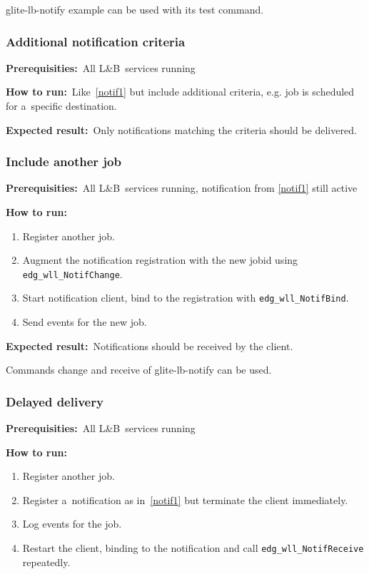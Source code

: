 \documentclass{egee}
\def\LB{L\&B}
\def\req{\noindent\textbf{Prerequisities:}}
\def\how{\noindent\textbf{How to run:}}
\def\result{\noindent\textbf{Expected result:}}
\def\path#1{{\normalfont\textsf{#1}}}
\def\code#1{\texttt{#1}}
\begin{document}
\begin{hints}
\path{glite-lb-notify} example can be used with its \path{test} command.
\end{hints}

\subsubsection{Additional notification criteria}
\label{notif-complex}
\req\ All \LB\ services running

\how\ Like~\ref{notif1} but include additional criteria,
e.g. job is scheduled for a~specific destination.

\result\ Only notifications matching the criteria should be delivered.

\subsubsection{Include another job}
\label{notif2}
\req\ All \LB\ services running, notification from \ref{notif1} still active

\how\ 
\begin{enumerate}
\item Register another job.
\item Augment the notification registration with the new jobid using
\code{edg\_wll\_NotifChange}.
\item Start notification client, bind to the registration with
\code{edg\_wll\_NotifBind}.
\item Send events for the new job.
\end{enumerate}

\result\ Notifications should be received by the client.

\begin{hints}
Commands \path{change} and \path{receive} of \path{glite-lb-notify}
can be used.
\end{hints}


\subsubsection{Delayed delivery}

\req\ All \LB\ services running

\how\ 
\begin{enumerate}
\item Register another job.
\item Register a~notification as in~\ref{notif1} but terminate the client
immediately.
\item Log events for the job.
\item Restart the client, binding to the notification and call
\code{edg\_wll\_NotifReceive} repeatedly.
\end{enumerate}
\end{document}
